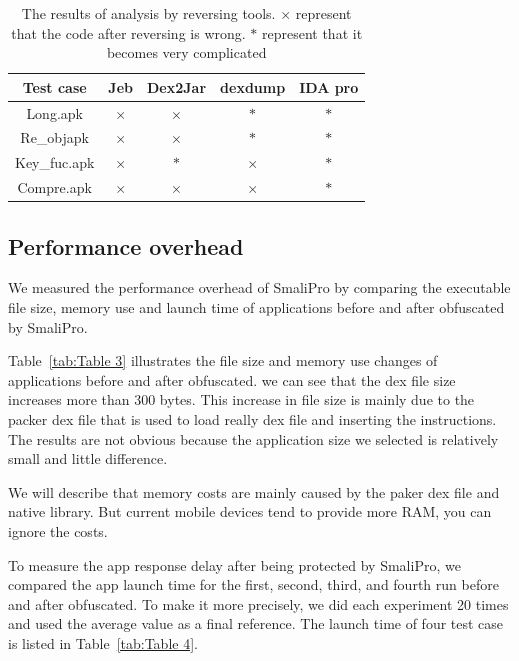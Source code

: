 \begin{table}[htbp]
  \centering
  \begin{tabular}{c c c c c}
  \toprule
  Test case & Jeb & Dex2Jar & dexdump & IDA pro\\
  \hline
  \hline

  Long.apk  & $\times$ & $\times$ & $\ast$ & $\ast$\\


  Re\_objapk & $\times$ & $\times$ & $\ast$ & $\ast$\\


  Key\_fuc.apk & $\times$ & $\ast$ & $\times$ & $\ast$\\


  Compre.apk & $\times$ & $\times$ & $\times$ & $\ast$\\
  \bottomrule
  \end{tabular}
   \caption{The results of analysis by reversing tools. $\times$ represent that the code after reversing is wrong. $\ast$ represent that it becomes very complicated}\label{tab:Table 2}
\end{table}

\subsection{Performance overhead}
We measured the performance overhead of SmaliPro by comparing the executable file size, memory use and launch time of applications before and after obfuscated by SmaliPro.

Table~\ref{tab:Table 3} illustrates the file size and memory use changes of applications before and after obfuscated. we can see that the dex file size increases more than 300 bytes. This increase in file size is mainly due to the packer dex file that is used to load really dex file and inserting the instructions. The results are not obvious because the application size we selected is relatively small and little difference.

We will describe that memory costs are mainly caused by the paker dex file and native library. But current mobile devices tend to provide more RAM, you can ignore the costs.

To measure the app response delay after being protected by SmaliPro, we compared the app launch time for the first, second, third, and fourth run before and after obfuscated. To make it more precisely, we did each experiment 20 times and used the average value as a final reference. The launch time of four test case is listed in Table~\ref{tab:Table 4}.

